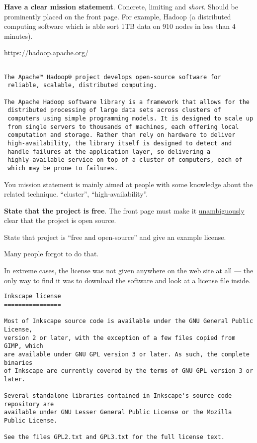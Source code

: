 \documentclass[landscape,30pt]{foils}
\begin{document}
{\bf Have a clear mission statement}.  Concrete, limiting and {\em short}.   Should be prominently placed on the front page.   For example, Hadoop (a distributed computing software which is able sort 1TB data on 910 nodes in less than 4 minutes).

https://hadoop.apache.org/


\newpage
{\scriptsize
\begin{verbatim}

The Apache™ Hadoop® project develops open-source software for
 reliable, scalable, distributed computing.

The Apache Hadoop software library is a framework that allows for the
 distributed processing of large data sets across clusters of
 computers using simple programming models. It is designed to scale up
 from single servers to thousands of machines, each offering local
 computation and storage. Rather than rely on hardware to deliver
 high-availability, the library itself is designed to detect and
 handle failures at the application layer, so delivering a
 highly-available service on top of a cluster of computers, each of
 which may be prone to failures.

\end{verbatim}
}

You mission statement is mainly aimed at people with some knowledge
about the related technique.  ``cluster'', ``high-availability''.

{\bf State that the project is free}.  The front page must make it
\underline{unambiguously} clear that the project is open source.

State that project is ``free and open-source'' and give an example
license.

Many people forgot to do that.

In extreme cases, the license was not given anywhere on the web site
at all — the only way to find it was to download the software and look
at a license file inside.


{\tiny
\begin{verbatim}
Inkscape license
================

Most of Inkscape source code is available under the GNU General Public License,
version 2 or later, with the exception of a few files copied from GIMP, which
are available under GNU GPL version 3 or later. As such, the complete binaries
of Inkscape are currently covered by the terms of GNU GPL version 3 or later.

Several standalone libraries contained in Inkscape's source code repository are
available under GNU Lesser General Public License or the Mozilla Public License.

See the files GPL2.txt and GPL3.txt for the full license text.
\end{verbatim}
}
\end{document}
